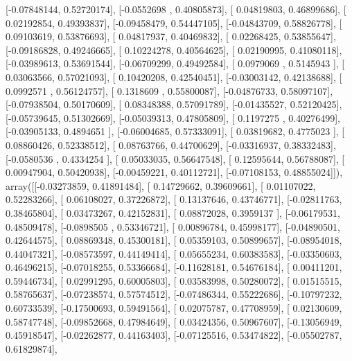 \documentclass{article}
\begin{document}
       [-0.07848144,  0.52720174],
       [-0.0552698 ,  0.40805873],
       [ 0.04819803,  0.46899686],
       [ 0.02192854,  0.49393837],
       [-0.09458479,  0.54447105],
       [-0.04843709,  0.58826778],
       [ 0.09103619,  0.53876693],
       [ 0.04817937,  0.40469832],
       [ 0.02268425,  0.53855647],
       [-0.09186828,  0.49246665],
       [ 0.10224278,  0.40564625],
       [ 0.02190995,  0.41080118],
       [-0.03989613,  0.53691544],
       [-0.06709299,  0.49492584],
       [ 0.0979069 ,  0.5145943 ],
       [ 0.03063566,  0.57021093],
       [ 0.10420208,  0.42540451],
       [-0.03003142,  0.42138688],
       [ 0.0992571 ,  0.56124757],
       [ 0.1318609 ,  0.55800087],
       [-0.04876733,  0.58097107],
       [-0.07938504,  0.50170609],
       [ 0.08348388,  0.57091789],
       [-0.01435527,  0.52120425],
       [-0.05739645,  0.51302669],
       [-0.05039313,  0.47805809],
       [ 0.1197275 ,  0.40276499],
       [-0.03905133,  0.4894651 ],
       [-0.06004685,  0.57333091],
       [ 0.03819682,  0.4775023 ],
       [ 0.08860426,  0.52338512],
       [ 0.08763766,  0.44700629],
       [-0.03316937,  0.38332483],
       [-0.0580536 ,  0.4334254 ],
       [ 0.05033035,  0.56647548],
       [ 0.12595644,  0.56788087],
       [ 0.00947904,  0.50420938],
       [-0.00459221,  0.40112721],
       [-0.07108153,  0.48855024]]), array([[-0.03273859,  0.41891484],
       [ 0.14729662,  0.39609661],
       [ 0.01107022,  0.52283266],
       [ 0.06108027,  0.37226872],
       [ 0.13137646,  0.43746771],
       [-0.02811763,  0.38465804],
       [ 0.03473267,  0.42152831],
       [ 0.08872028,  0.3959137 ],
       [-0.06179531,  0.48509478],
       [-0.0898505 ,  0.53346721],
       [ 0.00896784,  0.45998177],
       [-0.04890501,  0.42644575],
       [ 0.08869348,  0.45300181],
       [ 0.05359103,  0.50899657],
       [-0.08954018,  0.44047321],
       [-0.08573597,  0.44149414],
       [ 0.05655234,  0.60383583],
       [-0.03350603,  0.46496215],
       [-0.07018255,  0.53366684],
       [-0.11628181,  0.54676184],
       [ 0.00411201,  0.59446734],
       [ 0.02991295,  0.60005803],
       [ 0.03583998,  0.50280072],
       [ 0.01515515,  0.58765637],
       [-0.07238574,  0.57574512],
       [-0.07486344,  0.55222686],
       [-0.10797232,  0.60733539],
       [-0.17500693,  0.59491564],
       [ 0.02075787,  0.47708959],
       [ 0.02130609,  0.58747748],
       [-0.09852668,  0.47984649],
       [ 0.03424356,  0.50967607],
       [-0.13056949,  0.45918547],
       [-0.02262877,  0.44163403],
       [-0.07125516,  0.53474822],
       [-0.05502787,  0.61829874],
\end{document}
